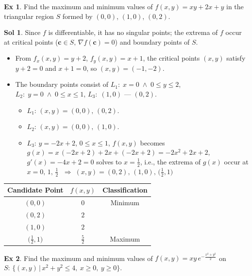 \documentclass[12pt]{extarticle}
\newcommand{\ds}{\displaystyle}
\newcommand{\ie}{\;\Longrightarrow\;}
\newcommand{\andd}{\;\wedge\;}
\theoremstyle{definition}
\newtheorem*{ex}{Ex}
\newtheorem*{sol}{Sol}
\newcommand{\vc}{\mathbf{c}}
\begin{document}
\begin{ex}
  Find the maximum and minimum values of $\ds f(x, y) = xy + 2x + y$ in the triangular region $S$ formed by $(0, 0)$, $(1, 0)$, $(0, 2)$. 
\end{ex}

\begin{sol}
  Since $f$ is differentiable, it has no singular points; the extrema of $f$ occur at critical points ($\vc\in S,\,\nabla f(\vc) = 0$) and boundary points of $S$. 
  \begin{itemize}\setlength\itemsep{0em}
    \item From $\ds f_x(x, y) = y + 2$, $\ds f_y(x, y) = x + 1$, the critical points $(x, y)$ satisfy $\ds y + 2 = 0$ and $\ds x + 1 = 0$, so $(x, y) = (-1, -2)$. 
    \item The boundary points consist of $L_1:\;x = 0\andd 0\leqslant y\leqslant 2$, $L_2:\;y = 0\andd 0\leqslant x\leqslant 1$, $L_3:\;(1, 0)$ --- $(0, 2)$. 
      \begin{itemize}\setlength\itemsep{0em}
        \item $L_1$: $(x, y) = (0, 0),\,(0, 2)$. 
        \item $L_2$: $(x, y) = (0, 0),\,(1, 0)$. 
        \item $L_3$: $y = -2 x + 2$, $0\leqslant x\leqslant 1$, $f(x, y)$ becomes $g(x) = x\,(-2x + 2) + 2x + (-2x + 2) = -2x^2 + 2x + 2$, $g'(x) = -4x + 2 = 0$ solves to $x = \frac{1}{2}$, i.e., the extrema of $g(x)$ occur at $x = 0,\,1,\,\frac{1}{2}$ $\ie (x, y) = (0, 2),\,(1, 0),\,\big(\frac{1}{2}, 1\big)$ 
      \end{itemize}
  \end{itemize}
  \begin{center}
  \renewcommand{\arraystretch}{1.3}
  \begin{tabular}{ccc}
    \toprule
    Candidate Point & $f(x, y)$ & Classification \\    
    \midrule
    $(0, 0)$ & $0$ & Minimum \\
    $(0, 2)$ & $2$ &  \\
    $(1, 0)$ & $2$ &  \\
    $\big(\frac{1}{2}, 1\big)$  & $\frac{5}{2}$ & Maximum \\ 
    \bottomrule
  \end{tabular}
  \renewcommand{\arraystretch}{1.0}
  \end{center}
\end{sol}

\begin{ex}
  Find the maximum and minimum values of $\ds f(x, y) = xy\,e^{-\frac{x^2 + y^2}{2}}$ on $\ds S:\,\big\{(x, y)\,|\,x^2 + y^2\leqslant 4,\ x\geqslant 0,\ y\geqslant 0\big\}$. 
\end{ex}
\end{document}
